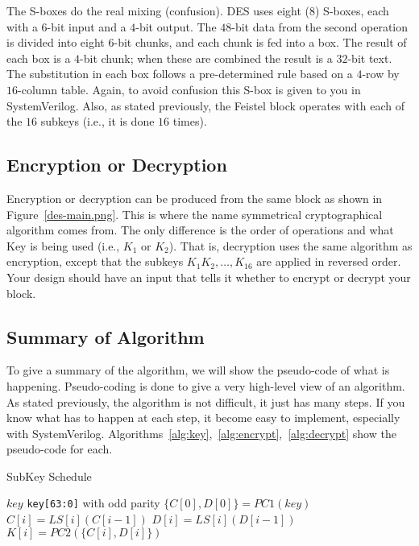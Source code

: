 \documentclass{article}
\begin{document}
The S-boxes do the real mixing (confusion). DES uses eight ($8$)
S-boxes, each
with a $6$-bit input and
a $4$-bit output.  The $48$-bit data from the second operation is divided
into eight $6$-bit chunks, and each chunk is fed into a box. The result
of each box is a $4$-bit chunk; when these are combined the result is a
$32$-bit text. The substitution in each box follows a pre-determined
rule based on a $4$-row by $16$-column table.  Again, to avoid
confusion this S-box is given to you in SystemVerilog.
Also, as stated previously, the Feistel block operates with each of
the $16$ subkeys (i.e., it is done $16$ times).

\subsection{Encryption or Decryption}

Encryption or decryption can be produced from the same block as shown in
Figure~\ref{des-main.png}.  This is where the name symmetrical
cryptographical algorithm comes from.  The only difference is the
order of operations and what Key is being
used (i.e., $K_1$ or $K_2$).
That is, decryption uses the same algorithm as encryption, except that
the subkeys $K_1 K_2, \ldots, K_{16}$ are applied in reversed order.
Your design should have an input that tells it whether to
encrypt or decrypt your block.

\subsection{Summary of Algorithm}

To give a summary of the algorithm, we will show the pseudo-code of
what is happening.  Pseudo-coding is done to give a very high-level
view of an algorithm.  As stated previously, the algorithm is not
difficult, it just has many steps.  If you know what has to happen at
each step, it become easy to implement, especially with SystemVerilog.
Algorithms~\ref{alg:key},~\ref{alg:encrypt},~\ref{alg:decrypt} show
the pseudo-code for each.  
\begin{algorithm}
\caption{SubKey Schedule}\label{alg:key}
\begin{algorithmic}
\Require $key$
\Ensure \verb!key[63:0]! with odd parity
\State $\{C[0], D[0]\} = PC1(key)$
\State $C[i] = LS[i](C[i-1])$
\State $D[i] = LS[i](D[i-1])$
\State $K[i] = PC2(\{C[i], D[i]\})$
\EndFor
\end{algorithmic}
\end{algorithm}
\end{document}
